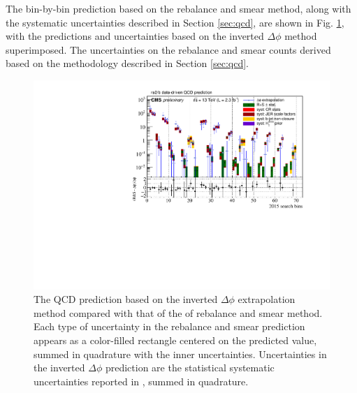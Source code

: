 The bin-by-bin prediction based on the rebalance and smear method, along with the systematic uncertainties described in Section \ref{sec:qcd}, are shown in Fig. \ref{fig:2015CompareQCD}, with the predictions and uncertainties based on the inverted $\Delta\phi$ method superimposed. The uncertainties on the rebalance and smear counts derived based on the methodology described in Section \ref{sec:qcd}.
\begin{figure}[tb!]
\centering
\includegraphics[width=\linewidth]{figures/SusySearches/Ra2b2015/2015CompareQCDErrors.pdf}
\caption{ The QCD prediction based on the inverted $\Delta\phi$ extrapolation method compared with that of the of rebalance and smear method. Each type of uncertainty in the rebalance and smear prediction appears as a color-filled rectangle centered on the predicted value, summed in quadrature with the inner uncertainties. Uncertainties in the inverted $\Delta\phi$ prediction are the statistical systematic uncertainties reported in \cite{Khachatryan:2016kdk}, summed in quadrature.}
\label{fig:2015CompareQCD}
\end{figure}

